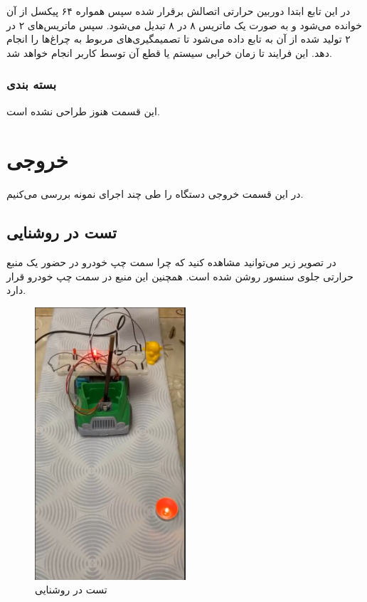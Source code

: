 در این تابع ابتدا دوربین حرارتی اتصالش برقرار شده سپس همواره ۶۴ پیکسل از آن خوانده می‌شود و به صورت یک ماتریس ۸ در ۸ تبدیل می‌شود. سپس ماتریس‌های ۲ در ۲ تولید شده از آن به تابع  داده می‌شود تا تصمیمگیری‌های مربوط به چراغ‌ها را انجام دهد. این فرایند تا زمان خرابی سیستم یا قطع آن توسط کاربر انجام خواهد شد.



\subsection{بسته بندی}
این قسمت هنوز طراحی نشده است.



\chapter{خروجی}
در این قسمت خروجی دستگاه را طی چند اجرای نمونه بررسی ‌می‌کنیم.

\section{تست در روشنایی}

در تصویر زیر می‌توانید مشاهده کنید که چرا سمت چپ خودرو در حضور یک منبع حرارتی جلوی سنسور روشن شده است. همچنین این منبع در سمت چپ خودرو قرار دارد. 

\begin{figure}[H]
	\centering
	\includegraphics[width=0.5\textwidth]{figs/test_with_lights_on.jpg}
	\caption{تست در روشنایی}
	\label{fig:2}
\end{figure}

